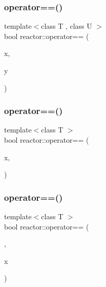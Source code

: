 \mbox{\label{namespacereactor_a9079eb51590f5e096fc3d8cfb073540f}} 
\subsubsection{\texorpdfstring{operator==()}{operator==()}\hspace{0.1cm}{\footnotesize\ttfamily [7/11]}}
{\footnotesize\ttfamily template$<$class T , class U $>$ \\
bool reactor\+::operator== (\begin{DoxyParamCaption}\item[{const \hyperlink{classreactor_1_1MutableValuePtr}{Mutable\+Value\+Ptr}$<$ T $>$ \&}]{x,  }\item[{const \hyperlink{classreactor_1_1ImmutableValuePtr}{Immutable\+Value\+Ptr}$<$ U $>$ \&}]{y }\end{DoxyParamCaption})}

\mbox{\label{namespacereactor_a2155cd0a1349ccb36b00bb369443a084}} 
\subsubsection{\texorpdfstring{operator==()}{operator==()}\hspace{0.1cm}{\footnotesize\ttfamily [8/11]}}
{\footnotesize\ttfamily template$<$class T $>$ \\
bool reactor\+::operator== (\begin{DoxyParamCaption}\item[{const \hyperlink{classreactor_1_1MutableValuePtr}{Mutable\+Value\+Ptr}$<$ T $>$ \&}]{x,  }\item[{std\+::nullptr\+\_\+t}]{ }\end{DoxyParamCaption})}

\mbox{\label{namespacereactor_a1c5731f8ed4863bfeaaeeba72f5eb765}} 
\subsubsection{\texorpdfstring{operator==()}{operator==()}\hspace{0.1cm}{\footnotesize\ttfamily [9/11]}}
{\footnotesize\ttfamily template$<$class T $>$ \\
bool reactor\+::operator== (\begin{DoxyParamCaption}\item[{std\+::nullptr\+\_\+t}]{,  }\item[{const \hyperlink{classreactor_1_1MutableValuePtr}{Mutable\+Value\+Ptr}$<$ T $>$ \&}]{x }\end{DoxyParamCaption})}


